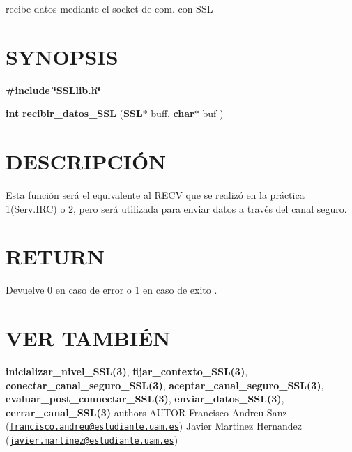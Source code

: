 recibe datos mediante el socket de com. con S\-S\-L\hypertarget{unknown_case_SYNOPSIS}{}\section{S\-Y\-N\-O\-P\-S\-I\-S}\label{unknown_case_SYNOPSIS}
{\bfseries \#include} {\bfseries \char`\"{}\-S\-S\-Llib.\-h\char`\"{}} 

{\bfseries int} {\bfseries recibir\-\_\-datos\-\_\-\-S\-S\-L} {\bfseries }({\bfseries S\-S\-L$\ast$} buff, {\bfseries char$\ast$} buf {\bfseries })\hypertarget{unknown_case_descripcion}{}\section{D\-E\-S\-C\-R\-I\-P\-C\-IÓ\-N}\label{unknown_case_descripcion}
Esta función será el equivalente al R\-E\-C\-V que se realizó en la práctica 1(Serv.\-I\-R\-C) o 2, pero será utilizada para enviar datos a través del canal seguro.\hypertarget{cerrar_canal_SSL_return}{}\section{R\-E\-T\-U\-R\-N}\label{cerrar_canal_SSL_return}
Devuelve 0 en caso de error o 1 en caso de exito .\hypertarget{unknown_case_seealso}{}\section{V\-E\-R T\-A\-M\-B\-IÉ\-N}\label{unknown_case_seealso}
{\bfseries inicializar\-\_\-nivel\-\_\-\-S\-S\-L(3)}, {\bfseries fijar\-\_\-contexto\-\_\-\-S\-S\-L(3)}, {\bfseries conectar\-\_\-canal\-\_\-seguro\-\_\-\-S\-S\-L(3)}, {\bfseries aceptar\-\_\-canal\-\_\-seguro\-\_\-\-S\-S\-L(3)}, {\bfseries evaluar\-\_\-post\-\_\-connectar\-\_\-\-S\-S\-L(3)}, {\bfseries enviar\-\_\-datos\-\_\-\-S\-S\-L(3)}, {\bfseries cerrar\-\_\-canal\-\_\-\-S\-S\-L(3)} {\bfseries }  authors A\-U\-T\-O\-R Francisco Andreu Sanz (\href{mailto:francisco.andreu@estudiante.uam.es}{\tt francisco.\-andreu@estudiante.\-uam.\-es}) Javier Martinez Hernandez (\href{mailto:javier.martinez@estudiante.uam.es}{\tt javier.\-martinez@estudiante.\-uam.\-es}) 
